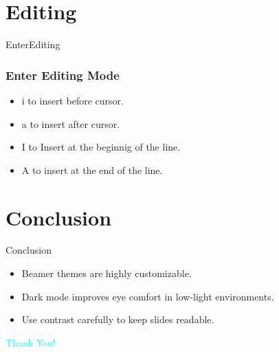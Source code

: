 \documentclass{beamer}
\begin{document}
\section{Editing}
\begin{frame}{EnterEditing}
    \frametitle{Enter Editing Mode}
    \begin{itemize}
        \item \textsf{i} to \textsf{i}nsert before cursor.
        \item \textsf{a} to insert \textsf{a}fter cursor.
        \item \textsf{I} to \textsf{I}nsert at the beginnig of the line.
        \item \textsf{A} to insert \textsf{a}t the end of the line.
    \end{itemize}
\end{frame}

\section{Conclusion}
\begin{frame}{Conclusion}
    \begin{itemize}
        \item Beamer themes are highly customizable.
        \item Dark mode improves eye comfort in low-light environments.
        \item Use contrast carefully to keep slides readable.
    \end{itemize}
\end{frame}

\begin{frame}
    \centering
    {\Huge \textcolor{cyan}{Thank You!}}
\end{frame}
\end{document}
